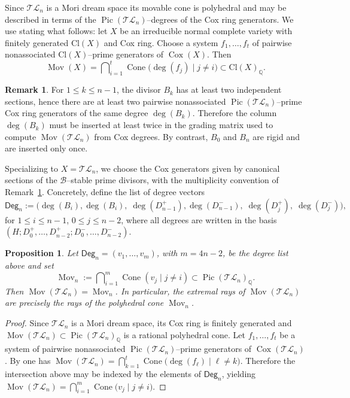 \documentclass[10pt]{amsart}
\newtheorem{proposition}[theorem]{Proposition}
\theoremstyle{definition}
\newtheorem{remark}[theorem]{Remark}
\newcommand{\Pic}{\operatorname{Pic}}
\newcommand{\Mov}{\operatorname{Mov}}
\DeclareMathOperator{\Cox}{Cox}
\newcommand{\TL}{\mathcal{TL}}
\newcommand{\QQ}{\mathbb{Q}}
\newcommand{\cone}{\operatorname{Cone}}
\theoremstyle{plain} %
\begin{document}
Since $\TL_n$ is a Mori dream space its movable cone is
polyhedral and may be described in terms of the $\operatorname{Pic}(\TL_n)$--degrees
of the Cox ring generators. We use \cite[Proposition~3.3.2.3]{ADHL15} stating what follows: let $X$ be an irreducible normal complete variety with finitely generated
$\mathrm{Cl}(X)$ and Cox ring. Choose a system
$f_1,\dots,f_t$ of pairwise nonassociated $\mathrm{Cl}(X)$--prime generators of
$\Cox(X)$. Then
\[
\Mov(X)=\bigcap\nolimits_{i=1}^t \cone\big(\deg(f_j)\mid j\ne i\big)
\subset \mathrm{Cl}(X)_\QQ.
\]

\begin{remark}
\label{rem:multiplicity}
For $1\le k\le n-1$, the divisor $B_k$ has at least two independent sections,
hence there are at least
two pairwise nonassociated $\Pic(\TL_n)$--prime Cox ring generators of the same
degree $\deg(B_k)$. Therefore the column $\deg(B_k)$ must be inserted at
least twice in the grading matrix used to compute $\Mov(\TL_n)$ from Cox
degrees. By contrast, $B_0$ and $B_n$ are rigid and are inserted only once.
\end{remark}

Specializing to $X=\TL_n$, we choose the Cox generators given by canonical
sections of the $\mathscr{B}$--stable prime divisors, with the multiplicity convention of
Remark~\ref{rem:multiplicity}. Concretely, define the list of degree vectors
\[
\mathsf{Deg}_n:=\big(\deg(B_i),\deg(B_i),\;
\deg(D_{n-1}^+),\deg(D_{n-1}^-),\;
\deg(D_j^+),\;
\deg(D_j^-)\big),
\]
for $1\leq i\leq n-1$, $0\leq j\leq n-2$, where all degrees are written in the basis
$(H;D_0^+,\dots,D_{n-2}^+;D_0^-,\dots,D_{n-2}^-)$.

\begin{proposition}\label{prop:mov-by-degrees}
Let $\mathsf{Deg}_n=(v_1,\dots,v_m)$, with $m = 4n-2$, be the degree list above and set
\[
\Mov_n := \bigcap\nolimits_{i=1}^m \cone(v_j\mid j\ne i)\subset \Pic(\TL_n)_\QQ.
\]
Then $\Mov(\TL_n)=\Mov_n$. In particular, the extremal rays of $\Mov(\TL_n)$ are
precisely the rays of the polyhedral cone $\Mov_n$.
\end{proposition}
\begin{proof}
Since $\TL_n$ is a Mori dream space, its Cox ring is finitely generated and $\Mov(\TL_n)\subset \Pic(\TL_n)_\QQ$ is a rational polyhedral cone. Let $f_1,\dots,f_t$ be a system of pairwise nonassociated $\Pic(\TL_n)$--prime generators of $\Cox(\TL_n)$. By \cite[Proposition~3.3.2.3]{ADHL15} one has $\Mov(\TL_n)=\bigcap_{k=1}^{t}\cone\bigl(\deg(f_\ell)\mid \ell\neq k\bigr)$. Therefore the intersection above may be indexed by the elements of $\mathsf{Deg}_n$, yielding $\Mov(\TL_n)=\bigcap_{i=1}^{m}\cone\bigl(v_j\mid j\neq i\bigr)$.
\end{proof}
\end{document}

